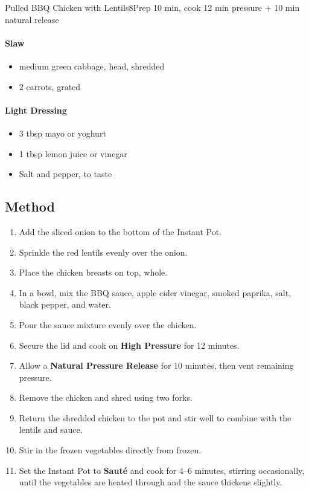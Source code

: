 \begin{recipebox}{Pulled BBQ Chicken with Lentils}{8}{Prep 10 min, cook 12 min pressure + 10 min natural release}
\paragraph{Slaw}
\begin{itemize}
    \item {} medium green cabbage, head, shredded
    \item 2 carrots, grated
\end{itemize}

\paragraph{Light Dressing}
\begin{itemize}
    \item 3 tbsp mayo or yoghurt
    \item 1 tbsp lemon juice or vinegar
    \item Salt and pepper, to taste
\end{itemize}

\subsection*{Method}
\begin{enumerate}
    \item Add the sliced onion to the bottom of the Instant Pot.
    \item Sprinkle the red lentils evenly over the onion.
    \item Place the chicken breasts on top, whole.
    \item In a bowl, mix the BBQ sauce, apple cider vinegar, smoked paprika, salt, black pepper, and water.
    \item Pour the sauce mixture evenly over the chicken.
    \item Secure the lid and cook on \textbf{High Pressure} for 12 minutes.
    \item Allow a \textbf{Natural Pressure Release} for 10 minutes, then vent remaining pressure.
    \item Remove the chicken and shred using two forks.
    \item Return the shredded chicken to the pot and stir well to combine with the lentils and sauce.
    \item Stir in the frozen vegetables directly from frozen.
    \item Set the Instant Pot to \textbf{Sauté} and cook for 4--6 minutes, stirring occasionally, until the vegetables are heated through and the sauce thickens slightly.
\end{enumerate}


\end{recipebox}
